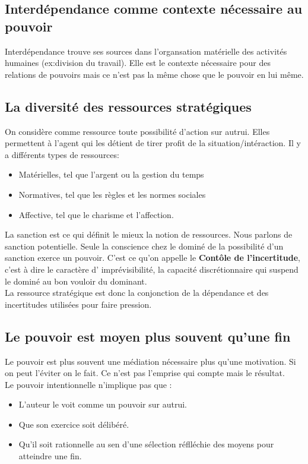 \documentclass[11pt]{article} %
\begin{document}
	\subsection{Interdépendance comme contexte nécessaire au pouvoir}
		Interdépendance trouve ses sources dans l'organsation matérielle des activités humaines (ex:division du travail).
		Elle est le contexte nécessaire pour des relations de pouvoirs mais ce n'est pas la même chose que le pouvoir en lui même.
	\subsection{La diversité des ressources stratégiques}
			On considère comme ressource toute possibilité d'action sur autrui. Elles permettent à l'agent 
			qui les détient de tirer profit de la situation/intéraction. Il y a différents types de ressources:
			\begin{itemize}
				\item Matérielles, tel que l'argent ou la gestion du temps
				\item Normatives, tel que les règles et les normes sociales
				\item Affective, tel que le charisme et l'affection.
			\end{itemize}
			La sanction est ce qui définit le mieux la notion de ressources. Nous parlons de sanction 
			potentielle. Seule la conscience chez le dominé de la possibilité d'un sanction exerce un pouvoir.
			C'est ce qu'on appelle le \textbf{Contôle de l'incertitude}, c'est à dire le caractère d'
			imprévisibilité, la capacité discrétionnaire qui suspend le dominé au bon vouloir du dominant.\\
			La ressource stratégique est donc la conjonction de la dépendance et des incertitudes utilisées 
			pour faire pression.
	\subsection{Le pouvoir est moyen plus souvent qu'une fin}
		Le pouvoir est plus souvent une médiation nécessaire plus qu'une motivation. Si on peut l'éviter 
		on le fait. Ce n'est pas l'emprise qui compte mais le résultat.\\
		Le pouvoir intentionnelle n'implique pas que :
		\begin{itemize}
			\item L'auteur le voit comme un pouvoir sur autrui.
			\item Que son exercice soit délibéré.
			\item Qu'il soit rationnelle au sen d'une sélection réflléchie des moyens pour atteindre une fin.
		\end{itemize}
\end{document}
